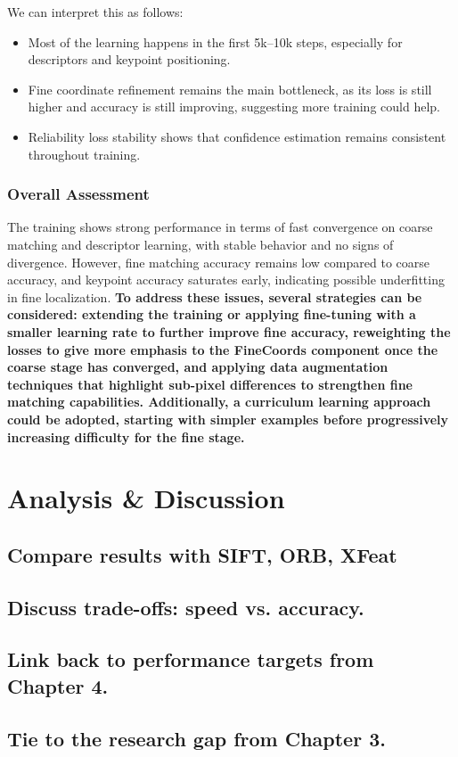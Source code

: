 We can interpret this as follows:
\begin{itemize}
    \item Most of the learning happens in the first 5k--10k steps, especially for descriptors and keypoint positioning.
    \item Fine coordinate refinement remains the main bottleneck, as its loss is still higher and accuracy is still improving, suggesting more training could help.
    \item Reliability loss stability shows that confidence estimation remains consistent throughout training.
\end{itemize}
\subsubsection{Overall Assessment}
The training shows strong performance in terms of fast convergence on coarse matching and descriptor learning, with stable behavior and no signs of divergence. However, fine matching accuracy remains low compared to coarse accuracy, and keypoint accuracy saturates early, indicating possible underfitting in fine localization. \textbf{To address these issues, several strategies can be considered: extending the training or applying fine-tuning with a smaller learning rate to further improve fine accuracy, reweighting the losses to give more emphasis to the FineCoords component once the coarse stage has converged, and applying data augmentation techniques that highlight sub-pixel differences to strengthen fine matching capabilities. Additionally, a curriculum learning approach could be adopted, starting with simpler examples before progressively increasing difficulty for the fine stage. }


\section{Analysis \& Discussion}
\subsection{Compare results with SIFT, ORB, XFeat}
\subsection{Discuss trade-offs: speed vs. accuracy.}
\subsection{Link back to performance targets from Chapter 4.}
\subsection{Tie to the research gap from Chapter 3.}
